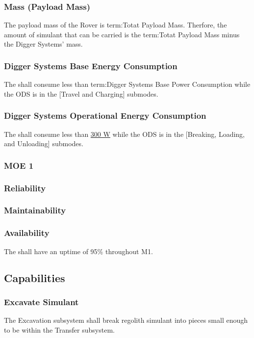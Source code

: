 \subsubsection{Mass (Payload Mass)}
\label{ref:Mass (Payload Mass)}
The payload mass of the Rover is {term:Totat Payload Mass}. Therfore, the amount of simulant that can be carried is the {term:Totat Payload Mass} minus the Digger Systems' mass.
\subsubsection{Digger Systems Base Energy Consumption}
\label{ref:Digger Systems Base Energy Consumption}
The  shall consume less than {term:Digger Systems Base Power Consumption} while the ODS is in the [Travel and Charging] submodes. 
\subsubsection{Digger Systems Operational Energy Consumption}
\label{ref:Digger Systems Operational Energy Consumption}
The  shall consume less than \hyperref[term:DS Max Power Consumption]{300 W} while the ODS is in the [Breaking, Loading, and Unloading] submodes.
\subsubsection{MOE 1}
\label{ref:MOE 1}

\subsubsection{Reliability}
\label{ref:Reliability}

\subsubsection{Maintainability}
\label{ref:Maintainability}

\subsubsection{Availability}
\label{ref:Availability}
The  shall have an uptime of 95\% throughout M1. 
\subsection{Capabilities}
\subsubsection{Excavate Simulant}
\label{ref:Excavate Simulant}
The Excavation subsystem shall break regolith simulant into pieces small enough to be within the Transfer subsystem. 
